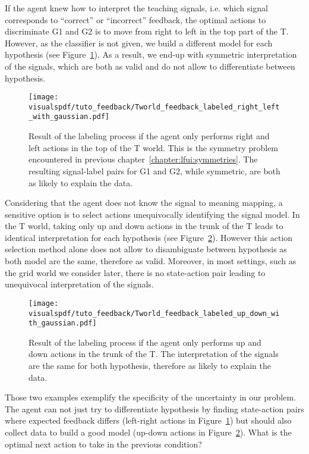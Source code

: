 If the agent knew how to interpret the teaching signals, i.e. which signal corresponds to ``correct'' or ``incorrect'' feedback, the optimal actions to discriminate G1 and G2 is to move from right to left in the top part of the T. However, as the classifier is not given, we build a different model for each hypothesis (see Figure~\ref{fig:planningrightleft}). As a result, we end-up with symmetric interpretation of the signals, which are both as valid and do not allow to differentiate between hypothesis.

\begin{figure}[!htbp]
  \centering
  \texttt{[image: \\visualspdf/tuto\_feedback/Tworld\_feedback\_labeled\_right\_left\_with\_gaussian.pdf]}
  \caption{Result of the labeling process if the agent only performs right and left actions in the top of the T world. This is the symmetry problem encountered in previous chapter~\ref{chapter:lfui:symmetries}. The resulting signal-label pairs for G1 and G2, while symmetric, are both as likely to explain the data.}
  \label{fig:planningrightleft}
\end{figure}

Considering that the agent does not know the signal to meaning mapping, a sensitive option is to select actions unequivocally identifying the signal model. In the T world, taking only up and down actions in the trunk of the T leads to identical interpretation for each hypothesis (see Figure~\ref{fig:planningupdown}). However this action selection method alone does not allow to disambiguate between hypothesis as both model are the same, therefore as valid. Moreover, in most settings, such as the grid world we consider later, there is no state-action pair leading to unequivocal interpretation of the signals.

\begin{figure}[!htbp]
  \centering
  \texttt{[image: \\visualspdf/tuto\_feedback/Tworld\_feedback\_labeled\_up\_down\_with\_gaussian.pdf]}
  \caption{Result of the labeling process if the agent only performs up and down actions in the trunk of the T. The interpretation of the signals are the same for both hypothesis, therefore as likely to explain the data.}
  \label{fig:planningupdown}
\end{figure}

Those two examples exemplify the specificity of the uncertainty in our problem. The agent can not just try to differentiate hypothesis by finding state-action pairs where expected feedback differs (left-right actions in Figure~\ref{fig:planningrightleft}) but should also collect data to build a good model (up-down actions in Figure~\ref{fig:planningupdown}). What is the optimal next action to take in the previous condition?

